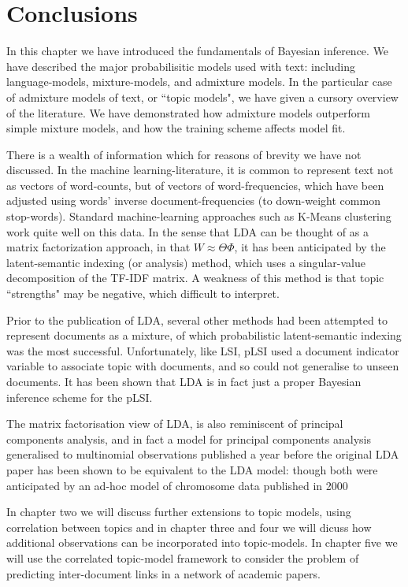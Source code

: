 \section{Conclusions}
In this chapter we have introduced the fundamentals of Bayesian inference. We have described the major probabilisitic models used with text: including language-models, mixture-models, and admixture models. In the particular case of admixture models of text, or ``topic models", we have given a cursory overview of the literature. We have demonstrated how admixture models outperform simple mixture models, and how the training scheme affects model fit. 


There is a wealth of information which for reasons of brevity we have not discussed. In the machine learning-literature, it is common to represent text not as vectors of word-counts, but of vectors of word-frequencies, which have been adjusted using words' inverse document-frequencies (to down-weight common stop-words). Standard machine-learning approaches such as K-Means clustering work quite well on this data. In the sense that LDA can be thought of as a matrix factorization approach, in that $W \approx \Theta \Phi$, it has been anticipated by the latent-semantic indexing (or analysis) method, which uses a singular-value decomposition of the TF-IDF matrix. A weakness of this method is that topic ``strengths" may be negative, which difficult to interpret. 

Prior to the publication of LDA, several other methods had been attempted to represent documents as a mixture, of which probabilistic latent-semantic indexing \cite{Hofmann1999a} was the most successful. Unfortunately, like LSI, pLSI used a document indicator variable to associate topic with documents, and so could not generalise to unseen documents. It has been shown\cite{GiKa2003} that LDA is in fact just a proper Bayesian inference scheme for the pLSI. 

The matrix factorisation view of LDA, is also reminiscent of principal components analysis, and in fact a model for principal components analysis generalised to multinomial observations\cite{Buntine2002} published a year before the original LDA paper has been shown to be equivalent to the LDA model: though both were anticipated by an ad-hoc model of chromosome data published in 2000\cite{Pritchard2000}

In chapter two we will discuss further extensions to topic models, using correlation between topics and in chapter three and four we will dicuss how additional observations can be incorporated into topic-models. In chapter five we will use the correlated topic-model framework to consider the problem of predicting inter-document links in a network of academic papers.


